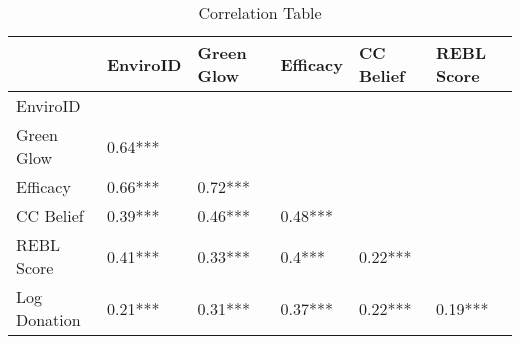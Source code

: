 \begin{table}
\centering
\caption{\label{tab:log_donation_regression}Correlation Table}
\centering
\fontsize{10}{12}\selectfont
\begin{tabular}[t]{llllll}
\toprule
 & EnviroID & Green Glow & Efficacy & CC Belief & REBL Score\\
\midrule
EnviroID &  &  &  &  & \\
Green Glow & 0.64*** &  &  &  & \\
Efficacy & 0.66*** & 0.72*** &  &  & \\
CC Belief & 0.39*** & 0.46*** & 0.48*** &  & \\
REBL Score & 0.41*** & 0.33*** & 0.4*** & 0.22*** & \\
\addlinespace
Log Donation & 0.21*** & 0.31*** & 0.37*** & 0.22*** & 0.19***\\
\bottomrule
\end{tabular}
\end{table}
